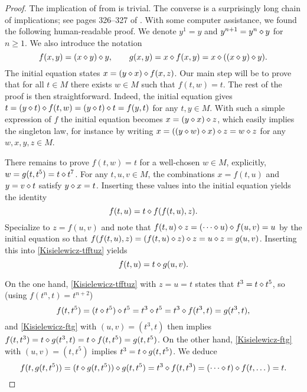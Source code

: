 \begin{proof}\leanok  The implication of  from  is trivial.  The converse is a surprisingly long chain of implications; see pages 326--327 of \cite{Kisielewicz2}.  With some computer assistance, we found the following human-readable proof.
We denote $y^1=y$ and $y^{n+1}=y^n\diamond y$ for $n\geq 1$.
We also introduce the notation
\begin{equation}
 f(x,y) = (x \diamond y) \diamond y , \qquad
 g(x,y) = x\diamond f(x,y) = x \diamond ((x \diamond y) \diamond y) .
\end{equation}
The initial equation states $x = (y \diamond x) \diamond f(x,z)$.
Our main step will be to prove that for all $t\in M$ there exists $w\in M$ such that $f(t,w) = t$.
The rest of the proof is then straightforward.
Indeed, the initial equation gives $t = (y \diamond t) \diamond f(t,w) = (y \diamond t) \diamond t = f(y,t)$ for any $t,y\in M$.
With such a simple expression of $f$ the initial equation becomes $x = (y \diamond x) \diamond z$, which easily implies the singleton law, for instance by writing $x = ((y \diamond w) \diamond x) \diamond z = w \diamond z$ for any $w,x,y,z \in M$.

There remains to prove $f(t,w) = t$ for a well-chosen $w \in M$, explicitly, $w=g(t,t^5)=t\diamond t^7$.
For any $t,u,v \in M$, the combinations $x = f(t,u)$ and $y = v \diamond t$ satisfy $y \diamond x = t$.  Inserting these values into the initial equation yields the identity
\begin{equation}\label{Kisielewicz-tfftuz}
f(t,u) = t \diamond f(f(t,u),z) .
\end{equation}
Specialize to $z=f(u,v)$ and note that $f(t,u) \diamond z = (\cdots \diamond u) \diamond f(u,v) = u$ by the initial equation so that $f(f(t,u),z) = (f(t,u) \diamond z) \diamond z = u \diamond z = g(u,v)$.  Inserting this into \eqref{Kisielewicz-tfftuz} yields
\begin{equation}\label{Kisielewicz-ftg}
f(t,u) = t \diamond g(u,v) .
\end{equation}

On the one hand, \eqref{Kisielewicz-tfftuz} with $z=u=t$ states that $t^3 = t \diamond t^5$, so (using $f(t^n,t)=t^{n+2}$)
\begin{equation}
  f(t,t^5) = (t \diamond t^5) \diamond t^5 = t^3 \diamond t^5 = t^3 \diamond f(t^3,t) = g(t^3,t) ,
\end{equation}
and \eqref{Kisielewicz-ftg} with $(u,v)=(t^3,t)$ then implies $f(t,t^3) = t \diamond g(t^3,t) = t \diamond f(t,t^5) = g(t,t^5)$.
On the other hand, \eqref{Kisielewicz-ftg} with $(u,v)=(t,t^5)$ implies $t^3 = t \diamond g(t,t^5)$.  We deduce
\begin{equation}
  f(t,g(t,t^5)) = (t \diamond g(t,t^5)) \diamond g(t,t^5) = t^3 \diamond f(t, t^3) = (\cdots \diamond t) \diamond f(t,\dots) = t .
\end{equation}
\end{proof}

